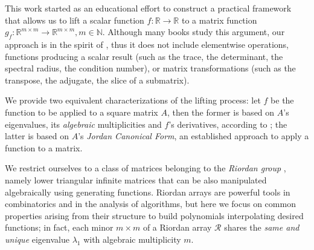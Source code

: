 
This work started as an educational effort to construct a practical framework
that allows us to lift a scalar function $f: \mathbb{R}\rightarrow\mathbb{R}$
to a matrix function $g_{f}: \mathbb{R}^{m\times
m}\rightarrow\mathbb{R}^{m\times m}, m\in\mathbb{N}$. Although many books
\citep{Gantmacher1959, GL1996, HJ1991, LT1985} study this argument, our approach
is in the spirit of \citep{Higham2008}, thus it does not include elementwise
operations, functions producing a scalar  result (such as the trace, the
determinant, the spectral radius, the condition number), or matrix
transformations (such as the transpose, the adjugate, the slice of a
submatrix).

We provide two equivalent characterizations of the lifting process: let $f$ be
the function to be applied to a square matrix $A$, then the former is based on
$A$'s eigenvalues, its \textit{algebraic} multiplicities and $f$'s derivatives,
according to \citep{RUNCKEL1983161, VERDESTAR2005285}; the latter is
based on $A$'s \textit{Jordan Canonical Form}, an established approach to
apply a function to a matrix.

We restrict ourselves to a class of matrices belonging to the \textit{Riordan
group} \citep{MRSV97, SHAPIRO1991229, SPRUGNOLI1994267, HE201515}, namely lower
triangular infinite matrices that can be also manipulated algebraically using
generating functions.  Riordan arrays are powerful tools in combinatorics and
in the analysis of algorithms, but here we focus on common properties arising
from their structure to build polynomials interpolating desired functions; in
fact, each minor $m\times m$ of a Riordan array $\mathcal{R}$ shares the
\textit{same and unique} eigenvalue $\lambda_{1}$ with algebraic multiplicity
$m$.

